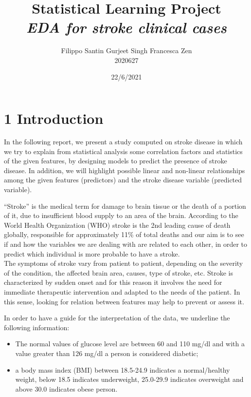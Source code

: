 \documentclass[
]{article}
\title{Statistical Learning Project\\ \textit{EDA for stroke clinical cases}}
\author{Filippo Santin \qquad \qquad Gurjeet Singh \qquad \qquad Francesca Zen\\
2020627\quad \qquad \qquad \qquad 2004251 \qquad \qquad \quad \qquad 2010640}
\date{22/6/2021}
\providecommand{\tightlist}{%
  \setlength{\itemsep}{0pt}\setlength{\parskip}{0pt}}
\begin{document}
\maketitle

\hypertarget{introduction}{%
\section{1 Introduction}\label{introduction}}

In the following report, we present a study computed on stroke
disease in which we try to explain from statistical analysis some
correlation factors and statistics of the given features, by designing
models to predict the presence of stroke disease. In addition, we will
highlight possible linear and non-linear relationships among the given
features (predictors) and the stroke disease variable (predicted
variable).

``Stroke'' is the medical term for damage to brain tissue or the death
of a portion of it, due to insufficient blood supply to an area of the
brain. According to the World Health Organization (WHO) stroke is the
2nd leading cause of death globally, responsible for approximately 11\%
of total deaths and our aim is to see if and how the variables we are
dealing with are related to each other, in order to predict which individual is more probable to have a stroke.\\
The symptoms of stroke vary from patient to patient, depending on the
severity of the condition, the affected brain area, causes, type of
stroke, etc. Stroke is characterized by sudden onset and for this reason
it involves the need for immediate therapeutic intervention and adapted
to the needs of the patient. In this sense, looking for relation between
features may help to prevent or assess it.

In order to have a guide for the interpretation of the data, we underline
the following information:

\begin{itemize}
\tightlist
\item
  The normal values of glucose level are between 60 and 110 mg/dl and
  with a value greater than 126 mg/dl a person is considered diabetic;
\item
  a body mass index (BMI) between 18.5-24.9 indicates a normal/healthy
  weight, below 18.5 indicates underweight, 25.0-29.9 indicates
  overweight and above 30.0 indicates obese person.
\end{itemize}
\end{document}
